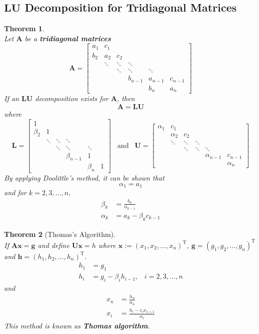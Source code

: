 \documentclass[12pt]{article}
\newtheorem{theorem}{Theorem}[section]
\theoremstyle{definition}
\begin{document}
\subsection{$\mathbf{LU}$ Decomposition for Tridiagonal Matrices}
\begin{theorem}\hfill\\\normalfont
Let $\mathbf{A}$ be a \textbf{tridiagonal matrices} 
\[
\mathbf{A}=\begin{bmatrix}
a_1&c_1&&&&\\
b_2&a_2&c_2&&&\\
&\ddots&\ddots&\ddots&&\\
&&\ddots&\ddots&\ddots&\\
&&&b_{n-1}&a_{n-1}&c_{n-1}\\
&&&&b_n&a_n
\end{bmatrix}
\]
If an $\mathbf{LU}$ decomposition exists for $\mathbf{A}$, then
\[
\mathbf{A}=\mathbf{LU}
\]
where
\[
\mathbf{L}=\begin{bmatrix}
1&&&&&\\
\beta_2&1&&&&\\
&\ddots&\ddots&\ddots&&\\
&&\ddots&\ddots&\ddots&\\
&&&\beta_{n-1}&1&\\
&&&&\beta_n&1
\end{bmatrix}\;\;\;\text{and}\;\;\;\mathbf{U}=\begin{bmatrix}
\alpha_1&c_1&&&&\\
&\alpha_2&c_2&&&\\
&\ddots&\ddots&\ddots&&\\
&&\ddots&\ddots&\ddots&\\
&&&&\alpha_{n-1}&c_{n-1}\\
&&&&&\alpha_n
\end{bmatrix}
\]
By applying Doolittle's method, it can be shown that
\[
\alpha_1 = a_1
\]
and for $k = 2, 3,\ldots, n$,
\begin{align*}
\beta_k &=\frac{b_k}{\alpha_{k-1}}\\
\alpha_k&=a_k - \beta_k c_{k-1}
\end{align*}
\end{theorem}
\begin{theorem}[Thomas's Algorithm]
\hfill\\\normalfont If $\mathbf{Ax}=\mathbf{g}$ and define $\mathbf{Ux} = h$ where $\mathbf{x}:=(x_1,x_2,\ldots, x_n)^\text{T}$, $\mathbf{g}=(g_1,g_2,\ldots, g_n)^\text{T}$ and $\mathbf{h}=(h_1,h_2,\ldots, h_n)^\text{T}$. 
\begin{align*}
h_1&=g_1\\
h_i&=g_i-\beta_ih_{i-1},\;\;\; i = 2, 3, \ldots, n
\end{align*}
and
\begin{align*}
x_n &=\frac{h_n}{\alpha_n}\\
x_i &=\frac{h_i-c_ix_{x+1}}{\alpha_i}
\end{align*}
This method is known as \textbf{Thomas algorithm}.
\end{theorem}
\end{document}
